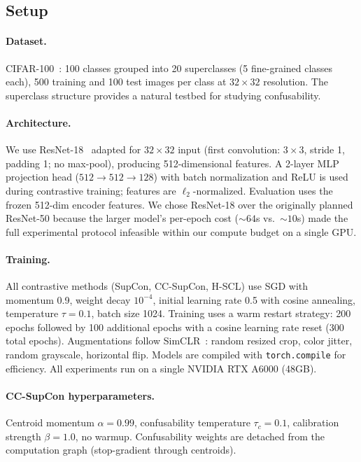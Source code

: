 \documentclass{article}
\begin{document}
\subsection{Setup}
\label{sec:setup}

\paragraph{Dataset.} CIFAR-100~\citep{krizhevsky2009learning}: 100 classes grouped into 20 superclasses (5 fine-grained classes each), 500 training and 100 test images per class at $32 \times 32$ resolution. The superclass structure provides a natural testbed for studying confusability.

\paragraph{Architecture.} We use ResNet-18~\citep{he2016deep} adapted for $32 \times 32$ input (first convolution: $3 \times 3$, stride 1, padding 1; no max-pool), producing 512-dimensional features. A 2-layer MLP projection head ($512 \to 512 \to 128$) with batch normalization and ReLU is used during contrastive training; features are $\ell_2$-normalized. Evaluation uses the frozen 512-dim encoder features. We chose ResNet-18 over the originally planned ResNet-50 because the larger model's per-epoch cost (${\sim}64$s vs.\ ${\sim}10$s) made the full experimental protocol infeasible within our compute budget on a single GPU.

\paragraph{Training.} All contrastive methods (SupCon, CC-SupCon, H-SCL) use SGD with momentum 0.9, weight decay $10^{-4}$, initial learning rate 0.5 with cosine annealing, temperature $\tau = 0.1$, batch size 1024. Training uses a warm restart strategy: 200 epochs followed by 100 additional epochs with a cosine learning rate reset (300 total epochs). Augmentations follow SimCLR~\citep{chen2020simple}: random resized crop, color jitter, random grayscale, horizontal flip. Models are compiled with \texttt{torch.compile} for efficiency. All experiments run on a single NVIDIA RTX A6000 (48GB).

\paragraph{CC-SupCon hyperparameters.} Centroid momentum $\alpha = 0.99$, confusability temperature $\tau_c = 0.1$, calibration strength $\beta = 1.0$, no warmup. Confusability weights are detached from the computation graph (stop-gradient through centroids).
\end{document}
